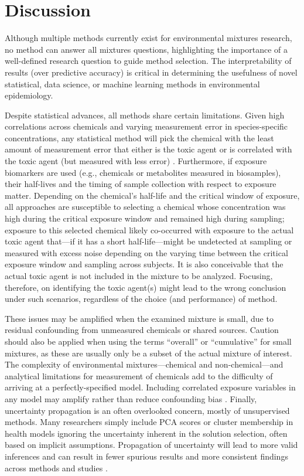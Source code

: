 \section{Discussion}\label{sec:Discuss}

Although multiple methods currently exist for environmental mixtures research, no method can answer all mixtures questions, highlighting the importance of a well-defined research question to guide method selection. The interpretability of results (over predictive accuracy) is critical in determining the usefulness of novel statistical, data science, or machine learning methods in environmental epidemiology.

Despite statistical advances, all methods share certain limitations. Given high correlations across chemicals and varying measurement error in species-specific concentrations, any statistical method will pick the chemical with the least amount of measurement error that either is the toxic agent or is correlated with the toxic agent (but measured with less error) \citep{carroll2006measurement, pollack2012correlated}. Furthermore, if exposure biomarkers are used (e.g., chemicals or metabolites measured in biosamples), their half-lives and the timing of sample collection with respect to exposure matter. Depending on the chemical’s half-life and the critical window of exposure, all approaches are susceptible to selecting a chemical whose concentration was high during the critical exposure window and remained high during sampling; exposure to this selected chemical likely co-occurred with exposure to the actual toxic agent that---if it has a short half-life---might be undetected at sampling or measured with excess noise depending on the varying time between the critical exposure window and sampling across subjects. It is also conceivable that the actual toxic agent is not included in the mixture to be analyzed. Focusing, therefore, on identifying the toxic agent(s) might lead to the wrong conclusion under such scenarios, regardless of the choice (and performance) of method.

These issues may be amplified when the examined mixture is small, due to residual confounding from unmeasured chemicals or shared sources. Caution should also be applied when using the terms ``overall'' or ``cumulative'' for small mixtures, as these are usually only be a subset of the actual mixture of interest. The complexity of environmental mixtures---chemical and non-chemical---and analytical limitations for measurement of chemicals add to the difficulty of arriving at a perfectly-specified model. Including correlated exposure variables in any model may amplify rather than reduce confounding bias \citep{weisskopf2018bias}. Finally, uncertainty propagation is an often overlooked concern, mostly of unsupervised methods. Many researchers simply include PCA scores or cluster membership in health models ignoring the uncertainty inherent in the solution selection, often based on implicit assumptions. Propagation of uncertainty will lead to more valid inferences and can result in fewer spurious results and more consistent findings across methods and studies \citep{mak14_unc}.

